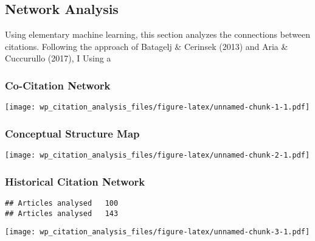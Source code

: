 \documentclass[]{article}
\begin{document}
\hypertarget{network-analysis}{%
\subsection{Network Analysis}\label{network-analysis}}

Using elementary machine learning, this section analyzes the connections
between citations. Following the approach of Batagelj \& Cerinsek (2013)
and Aria \& Cuccurullo (2017), I Using a

\hypertarget{co-citation-network}{%
\subsubsection{Co-Citation Network}\label{co-citation-network}}

\texttt{[image: wp\_citation\_analysis\_files/figure-latex/unnamed-chunk-1-1.pdf]}

\hypertarget{conceptual-structure-map}{%
\subsubsection{Conceptual Structure
Map}\label{conceptual-structure-map}}

\texttt{[image: wp\_citation\_analysis\_files/figure-latex/unnamed-chunk-2-1.pdf]}

\hypertarget{historical-citation-network}{%
\subsubsection{Historical Citation
Network}\label{historical-citation-network}}

\begin{verbatim}
## Articles analysed   100 
## Articles analysed   143
\end{verbatim}

\texttt{[image: wp\_citation\_analysis\_files/figure-latex/unnamed-chunk-3-1.pdf]}
\end{document}
